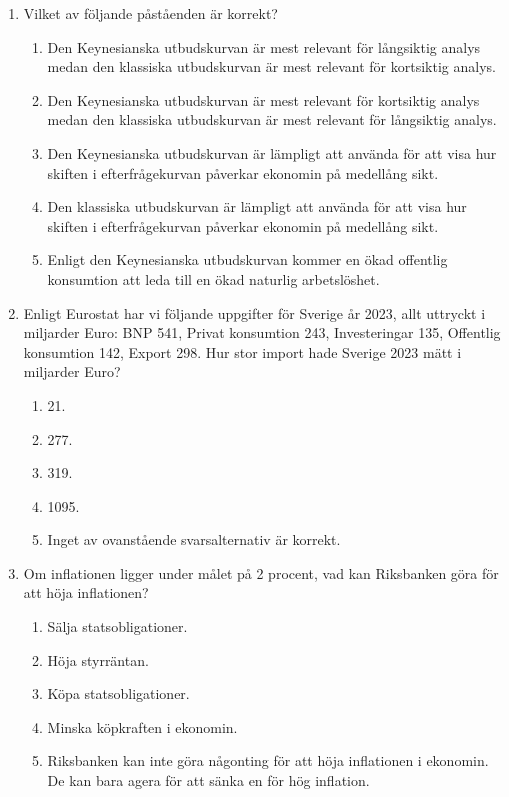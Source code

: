 \documentclass[12pt,a4paper]{article}
\begin{document}
\begin{enumerate}[label=\arabic*.]
    \item Vilket av följande påståenden är korrekt?
    \begin{enumerate}[label=\Alph*.]
        \item Den Keynesianska utbudskurvan är mest relevant för långsiktig analys medan den klassiska utbudskurvan är mest relevant för kortsiktig analys.
        \item Den Keynesianska utbudskurvan är mest relevant för kortsiktig analys medan den klassiska utbudskurvan är mest relevant för långsiktig analys.
        \item Den Keynesianska utbudskurvan är lämpligt att använda för att visa hur skiften i efterfrågekurvan påverkar ekonomin på medellång sikt.
        \item Den klassiska utbudskurvan är lämpligt att använda för att visa hur skiften i efterfrågekurvan påverkar ekonomin på medellång sikt.
        \item Enligt den Keynesianska utbudskurvan kommer en ökad offentlig konsumtion att leda till en ökad naturlig arbetslöshet.
    \end{enumerate}

    \item Enligt Eurostat har vi följande uppgifter för Sverige år 2023, allt uttryckt i miljarder Euro: BNP 541, Privat konsumtion 243, Investeringar 135, Offentlig konsumtion 142, Export 298. Hur stor import hade Sverige 2023 mätt i miljarder Euro?
    \begin{enumerate}[label=\Alph*.]
        \item 21.
        \item 277.
        \item 319.
        \item 1095.
        \item Inget av ovanstående svarsalternativ är korrekt.
    \end{enumerate}

    \item Om inflationen ligger under målet på 2 procent, vad kan Riksbanken göra för att höja inflationen?
    \begin{enumerate}[label=\Alph*.]
        \item Sälja statsobligationer.
        \item Höja styrräntan.
        \item Köpa statsobligationer.
        \item Minska köpkraften i ekonomin.
        \item Riksbanken kan inte göra någonting för att höja inflationen i ekonomin. De kan bara agera för att sänka en för hög inflation.
    \end{enumerate}


\end{enumerate}
\end{document}
